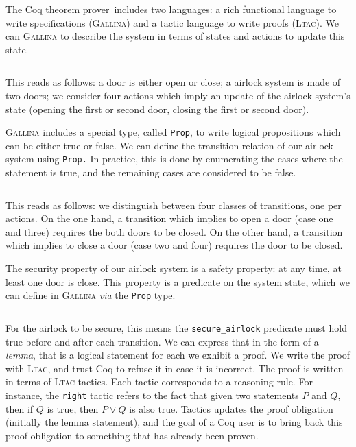 \begin{example}
  The Coq theorem prover\,\cite{coq} includes two languages: a rich functional
  language to write specifications ({\scshape Gallina}) and a tactic language to
  write proofs ({\scshape Ltac}).
  We can  {\scshape Gallina} to describe the system in terms of
  states and actions to update this state.

  \inputminted[firstline=1,lastline=14]{coq}{Listings/Airlock.v}

  This reads as follows: a door is either open or close; a airlock system is
  made of two doors; we consider four actions which imply an update of the
  airlock system's state (opening the first or second door, closing the first or
  second door).

  {\scshape Gallina} includes a special type, called \texttt{Prop}, to write
  logical propositions which can be either true or false.
  We can define the transition relation of our airlock system using
  \texttt{Prop.}
  In practice, this is done by enumerating the cases where the statement is
  true, and the remaining cases are considered to be false.

  \inputminted[firstline=16,lastline=33]{coq}{Listings/Airlock.v}

  This reads as follows: we distinguish between four classes of transitions, one
  per actions.
  On the one hand, a transition which implies to open a door (case one and
  three) requires the both doors to be closed.
  On the other hand, a transition which implies to close a door (case two and
  four) requires the door to be closed.

  The security property of our airlock system is a safety property: at any time,
  at least one door is close.
  This property is a predicate on the system state, which we can define in
  {\scshape Gallina} \emph{via} the \texttt{Prop} type.

  \inputminted[firstline=35,lastline=38]{coq}{Listings/Airlock.v}

  For the airlock to be secure, this means the \texttt{secure\_airlock}
  predicate must hold true before and after each transition.
  We can express that in the form of a \emph{lemma}, that is a logical statement
  for each we exhibit a proof.
  We write the proof with {\scshape Ltac}, and trust Coq to refuse it in case it
  is incorrect.
  The proof is written in terms of {\scshape Ltac} tactics.
  Each tactic corresponds to a reasoning rule.
  For instance, the \texttt{right} tactic refers to the fact that given two
  statements $P$ and $Q$, then if $Q$ is true, then $P \vee Q$ is also
  true. Tactics updates the proof obligation (initially the lemma statement),
  and the goal of a Coq user is to bring back this proof obligation to something
  that has already been proven.


\end{example}
